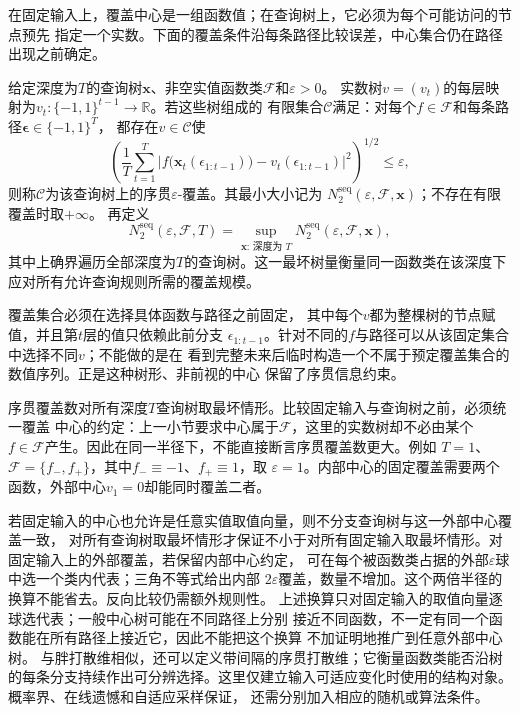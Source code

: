 在固定输入上，覆盖中心是一组函数值；在查询树上，它必须为每个可能访问的节点预先
指定一个实数。下面的覆盖条件沿每条路径比较误差，中心集合仍在路径出现之前确定。
\begin{definition}[序贯覆盖与序贯覆盖数]
\label{def:functional-sequential-cover}
给定深度为$T$的查询树$\bm x$、非空实值函数类$\mathcal F$和$\varepsilon>0$。
实数树$v=(v_t)$的每层映射为$v_t:\{-1,1\}^{t-1}\to\mathbb R$。若这些树组成的
有限集合$\mathcal C$满足：对每个$f\in\mathcal F$和每条路径$\bm\epsilon\in\{-1,1\}^T$，
都存在$v\in\mathcal C$使
\begin{equation}
  \left(
    \frac1T\sum_{t=1}^{T}
    \left|
      f\bigl(\bm{x}_t(\epsilon_{1:t-1})\bigr)
      -
      v_t(\epsilon_{1:t-1})
    \right|^2
  \right)^{1/2}
  \leq\varepsilon,
  \label{eq:functional-sequential-cover}
\end{equation}
则称$\mathcal C$为该查询树上的序贯$\varepsilon$-覆盖。其最小大小记为
$N_2^{\mathrm{seq}}(\varepsilon,\mathcal F,\bm x)$；不存在有限覆盖时取$+\infty$。
再定义
\[
 N_2^{\mathrm{seq}}(\varepsilon,\mathcal F,T)
 =\sup_{\bm x:\,\text{深度为 }T}
 N_2^{\mathrm{seq}}(\varepsilon,\mathcal F,\bm x),
\]
其中上确界遍历全部深度为$T$的查询树。这一最坏树量衡量同一函数类在该深度下
应对所有允许查询规则所需的覆盖规模。
\end{definition}
覆盖集合必须在选择具体函数与路径之前固定，
其中每个$v$都为整棵树的节点赋值，并且第$t$层的值只依赖此前分支
$\epsilon_{1:t-1}$。针对不同的$f$与路径可以从该固定集合中选择不同$v$；不能做的是在
看到完整未来后临时构造一个不属于预定覆盖集合的数值序列。正是这种树形、非前视的中心
保留了序贯信息约束。

序贯覆盖数对所有深度$T$查询树取最坏情形。比较固定输入与查询树之前，必须统一覆盖
中心的约定：上一小节要求中心属于$\mathcal F$，这里的实数树却不必由某个
$f\in\mathcal F$产生。因此在同一半径下，不能直接断言序贯覆盖数更大。例如
$T=1$、$\mathcal F=\{f_-,f_+\}$，其中$f_-\equiv-1$、$f_+\equiv1$，取
$\varepsilon=1$。内部中心的固定覆盖需要两个函数，外部中心$v_1=0$却能同时覆盖二者。

若固定输入的中心也允许是任意实值取值向量，则不分支查询树与这一外部中心覆盖一致，
对所有查询树取最坏情形才保证不小于对所有固定输入取最坏情形。对固定输入上的外部覆盖，若保留内部中心约定，
可在每个被函数类占据的外部$\varepsilon$球中选一个类内代表；三角不等式给出内部
$2\varepsilon$覆盖，数量不增加。这个两倍半径的换算不能省去。反向比较仍需额外规则性。
上述换算只对固定输入的取值向量逐球选代表；一般中心树可能在不同路径上分别
接近不同函数，不一定有同一个函数能在所有路径上接近它，因此不能把这个换算
不加证明地推广到任意外部中心树。
与胖打散维相似，还可以定义带间隔的序贯打散维；它衡量函数类能否沿树的每条分支持续作出可分辨选择。这里仅建立输入可适应变化时使用的结构对象。概率界、在线遗憾和自适应采样保证，
还需分别加入相应的随机或算法条件。

